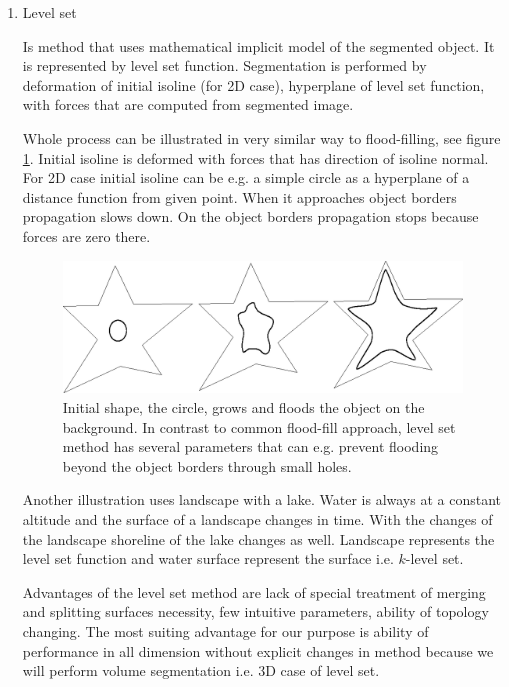 \begin{enumerate}
  \item Level set

\par
Is method that uses mathematical implicit model of the segmented object.
It is represented by level set function.
Segmentation is performed by deformation of initial isoline (for 2D case), hyperplane of level set function, with forces that are computed from segmented image.

\par
Whole process can be illustrated in very similar way to flood-filling, see figure \ref{fg:flooding}.
Initial isoline is deformed with forces that has direction of isoline normal.
For 2D case initial isoline can be e.g. a simple circle as a hyperplane of a distance function from given point.
When it approaches object borders propagation slows down.
On the object borders propagation stops because forces are zero there.

\begin{figure}
    \centering
    \includegraphics[width=12cm]{data/flooding}
    \caption[Flooding an object]{Initial shape, the circle, grows and floods the object on the background. In contrast to common flood-fill approach, level set method has several parameters that can e.g. prevent flooding beyond the object borders through small holes.}
    \label{fg:flooding}
\end{figure}

\par
Another illustration uses landscape with a lake.
Water is always at a constant altitude and the surface of a landscape changes in time.
With the changes of the landscape shoreline of the lake changes as well.
Landscape represents the level set function and water surface represent the surface i.e. $k$-level set.

\par
Advantages of the level set method are lack of special treatment of merging and splitting surfaces necessity, few intuitive parameters, ability of topology changing.
The most suiting advantage for our purpose is ability of performance in all dimension without explicit changes in method because we will perform volume segmentation i.e. 3D case of level set.

\end{enumerate}

